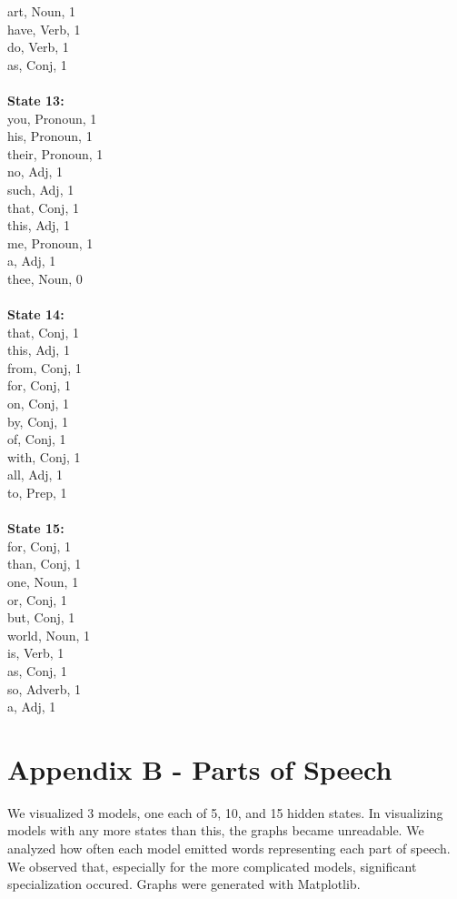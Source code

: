 \begin{multicols}{4}
art, Noun, 1\\
have, Verb, 1\\
do, Verb, 1\\
as, Conj, 1\\
\\
\noindent\textbf{State 13:} \\
you, Pronoun, 1\\
his, Pronoun, 1\\
their, Pronoun, 1\\
no, Adj, 1\\
such, Adj, 1\\
that, Conj, 1\\
this, Adj, 1\\
me, Pronoun, 1\\
a, Adj, 1\\
thee, Noun, 0\\
\\
\noindent\textbf{State 14:} \\
that, Conj, 1\\
this, Adj, 1\\
from, Conj, 1\\
for, Conj, 1\\
on, Conj, 1\\
by, Conj, 1\\
of, Conj, 1\\
with, Conj, 1\\
all, Adj, 1\\
to, Prep, 1\\
\\
\noindent\textbf{State 15:} \\
for, Conj, 1\\
than, Conj, 1\\
one, Noun, 1\\
or, Conj, 1\\
but, Conj, 1\\
world, Noun, 1\\
is, Verb, 1\\
as, Conj, 1\\
so, Adverb, 1\\
a, Adj, 1\\

\end{multicols}

\pagebreak
\section{Appendix B - Parts of Speech}
We visualized 3 models, one each of 5, 10, and 15 hidden states. In visualizing models with any more states than this, the graphs became unreadable. We analyzed how often each model emitted words representing each part of speech. We observed that, especially for the more complicated models, significant specialization occured. Graphs were generated with Matplotlib.

